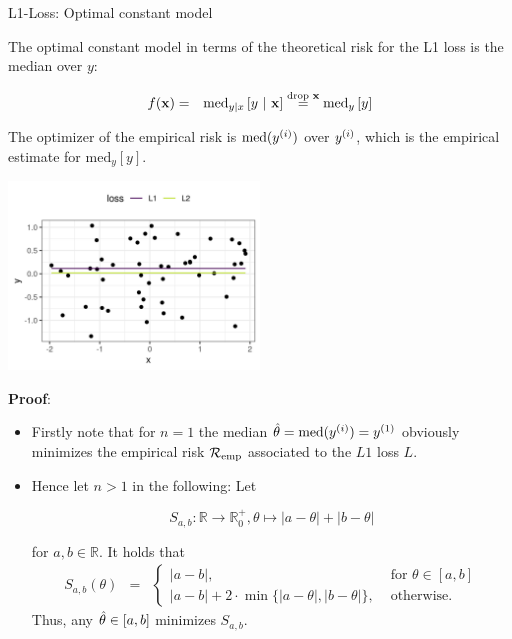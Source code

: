 \documentclass[11pt,compress,t,notes=noshow, xcolor=table]{beamer}
\begin{document}
\begin{vbframe}{L1-Loss: Optimal constant model}

The optimal constant model in terms of the theoretical risk for the L1 loss is the median over $y$:

\begin{eqnarray*}
  f(\mathbf{x}) &=& \text{med}_{y|x} \left[y ~|~ \mathbf{x} \right] \overset{\text{drop } \mathbf{x}}{=}  \text{med}_{y} \left[y \right]
  \end{eqnarray*} 

The optimizer of the empirical risk is $\text{med}(y^{(i)})$ over $y^{(i)}$, which is the empirical estimate for $\text{med}_{y} \left[y \right]$. 

\vspace*{-0.3cm}

\begin{center}
\includegraphics[width = 0.5\textwidth ]{figure/l1_vs_l2.png} \\
\end{center}


\framebreak 

\textbf{Proof}: 

\begin{itemize}
  \item Firstly note that for $n = 1$ the median $\hat{\theta} = \text{med}(y^{(i)}) = y^{(1)}$ obviously minimizes the empirical risk $\mathcal{R}_{\text{emp}}$ associated to the $L1$ loss $L$. 



  \item Hence let $n > 1$ in the following: Let 

  $$
    S_{a,b}:\mathbb{R} \rightarrow \mathbb{R}^+_0, \theta \mapsto |a- \theta| + |b-\theta|
  $$

  for $a, b \in \mathbb{R}$. It holds that
  \begin{eqnarray*}
  S_{a,b}(\theta) &=& \begin{cases}|a-b| ,& \text{ for } \theta \in [a,b]\\ |a-b| + 2\cdot\min\{|a-\theta|,|b-\theta|\}
  ,& \text{ otherwise. }\end{cases}
  \end{eqnarray*}
  Thus, any $\hat{\theta} \in [a,b]$ minimizes $S_{a,b}$. \\



\end{itemize}
\end{vbframe}
\end{document}
